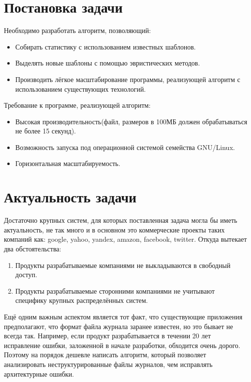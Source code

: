 \section{Постановка задачи}

Необходимо разработать алгоритм, позволяющий:
\begin{itemize}
  \item Собирать статистику с использованием известных шаблонов.
  \item Выделять новые шаблоны с помощью эвристических методов.
  \item Производить лёгкое масштабирование программы, реализующей алгоритм
    с использованием существующих технологий.
\end{itemize}

Требование к программе, реализующей алгоритм:
\begin{itemize}
  \item Высокая производительность(файл, размеров в 100МБ должен
     обрабатываться не более 15 секунд).
  \item Возможность запуска под операционной системой семейства GNU/Linux.
  \item Горизонтальная масштабируемость.
\end{itemize}

\section{Актуальность задачи}
Достаточно крупных систем, для которых поставленная задача могла бы иметь
актуальность, не так много и в основном это коммерческие проекты таких
компаний как: google, yahoo, yandex, amazon, facebook, twitter.
Откуда вытекает два обстоятельства:
\begin{enumerate}
  \item Продукты разрабатываемые компаниями не выкладываются в свободный доступ.
  \item Продукты разрабатываемые сторонними компаниями не учитывают специфику
    крупных распределённых систем.
\end{enumerate}
Ещё одним важным аспектом является тот факт, что существующие приложения
предполагают, что формат файла журнала заранее известен, но это бывает не
всегда так. Например, если продукт разрабатывается в течении 20 лет
исправление ошибки, заложенной в начале разработки, обходится очень дорого.
Поэтому на порядок дешевле написать алгоритм, который позволяет анализировать
неструктурированные файлы журналов, чем исправлять архитектурные ошибки.


